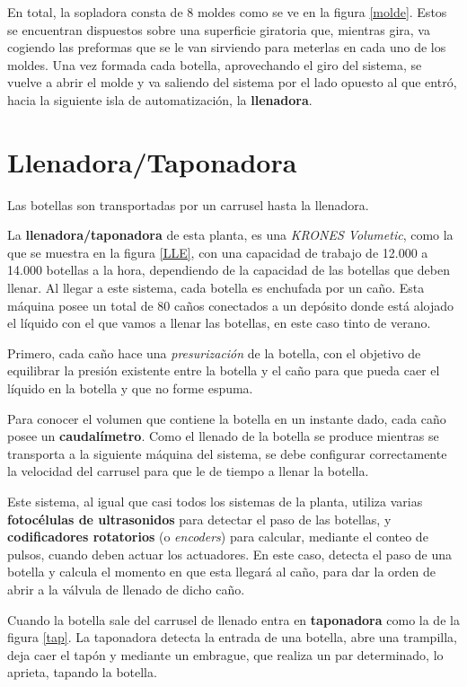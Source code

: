 \documentclass[11pt,a4paper,spanish,twoside]{report}
\begin{document}
En total, la sopladora consta de 8 moldes como se ve en la figura \ref{molde}. Estos se encuentran dispuestos 
sobre una superficie giratoria que, mientras gira, va cogiendo las preformas 
que se le van sirviendo para meterlas en cada uno de los moldes. Una vez 
formada cada botella, aprovechando el giro del sistema, se vuelve a abrir el 
molde y va saliendo del sistema por el lado opuesto al que entró, hacia la 
siguiente isla de automatización, la \textbf{llenadora}.

\section{Llenadora/Taponadora}
Las botellas son transportadas por un carrusel hasta la llenadora.

La \textbf{llenadora/taponadora} de esta planta, es una \emph{KRONES
  Vo\-lu\-me\-tic}, como la que se muestra en la figura \ref{LLE}, con 
una capacidad de trabajo de 12.000 a 14.000 botellas a la hora, dependiendo de
la capacidad de las botellas que deben llenar.
Al llegar a este sistema, cada botella es enchufada por un caño. Esta máquina 
posee un total de 80 caños conectados a un depósito donde está alojado el 
líquido con el que vamos a llenar las botellas, en este caso tinto de verano.

Primero, cada caño hace una \emph{presurización} de la botella, con el 
objetivo de equilibrar la presión existente entre la botella y el caño para 
que pueda caer el líquido en la botella y que no forme espuma.

Para conocer el volumen que contiene la botella en un instante dado, cada caño 
posee un \textbf{caudalímetro}. Como el llenado de la botella se produce
mientras se transporta a la siguiente máquina del sistema, se debe configurar
correctamente la velocidad del carrusel para que le de tiempo a llenar la 
botella.

Este sistema, al igual que casi todos los sistemas de la planta, utiliza 
varias \textbf{fotocélulas de ultrasonidos} para detectar el paso de las 
botellas, y \textbf{codificadores rotatorios} (o \emph{\emph{encoder}s}) para 
calcular, mediante el conteo de pulsos, cuando deben actuar los actuadores. 
En este caso, detecta el paso de una botella y calcula el momento en que esta 
llegará al caño, para dar la orden de abrir a la válvula de llenado de dicho 
caño.

Cuando la botella sale del carrusel de llenado entra en \textbf{taponadora}
como la de la figura \ref{tap}.
La taponadora detecta la entrada de una botella, abre una trampilla, deja caer 
el tapón y mediante un embrague, que realiza un par determinado, lo aprieta, 
tapando la botella.
\end{document}
